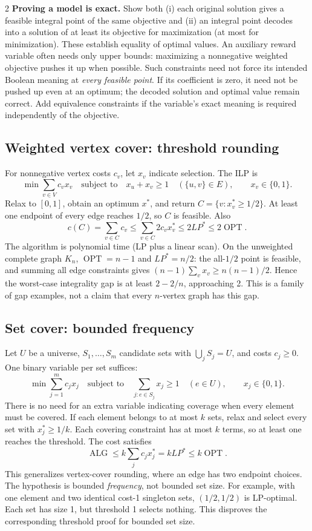 \documentclass[10pt]{article}
\theoremstyle{definition}
\newcommand{\OPT}{\operatorname{OPT}}
\newcommand{\ALG}{\operatorname{ALG}}
\begin{document}
\begin{multicols*}{2}
\textbf{Proving a model is exact.}
Show both (i) each original solution gives a feasible integral point of the
same objective and (ii) an integral point decodes into a solution of at least
its objective for maximization (at most for minimization). These establish
equality of optimal values. An auxiliary reward variable often needs only
upper bounds: maximizing a nonnegative weighted objective pushes it up when
possible. Such constraints need not force its intended Boolean meaning at
\emph{every feasible point}. If its coefficient is zero, it need not be
pushed up even at an optimum; the decoded solution and optimal value remain
correct. Add equivalence constraints if the variable's exact meaning is
required independently of the objective.

\subsection{Weighted vertex cover: threshold rounding}\label{lp:vc}
For nonnegative vertex costs $c_v$, let $x_v$ indicate selection. The ILP is
\[
  \min\sum_{v\in V}c_vx_v
  \quad\text{subject to}\quad
  x_u+x_v\ge1\quad(\{u,v\}\in E),\qquad x_v\in\{0,1\}.
\]
Relax to $[0,1]$, obtain an optimum $x^*$, and return
$C=\{v:x_v^*\ge1/2\}$. At least one endpoint of every edge reaches $1/2$,
so $C$ is feasible. Also
\[
  c(C)=\sum_{v\in C}c_v
    \le\sum_{v\in C}2c_vx_v^*
    \le2LP^*\le2\OPT.
\]
The algorithm is polynomial time (LP plus a linear scan).
On the unweighted complete graph $K_n$, $\OPT=n-1$ and $LP^*=n/2$:
the all-$1/2$ point is feasible, and summing all edge constraints gives
$(n-1)\sum_vx_v\ge n(n-1)/2$. Hence the worst-case integrality gap is
at least $2-2/n$, approaching 2. This is a family of gap examples, not a
claim that every $n$-vertex graph has this gap.

\subsection{Set cover: bounded frequency}\label{lp:cover}
Let $U$ be a universe, $S_1,\ldots,S_m$ candidate sets with
$\bigcup_jS_j=U$, and costs $c_j\ge0$. One binary variable per set suffices:
\[
  \min\sum_{j=1}^m c_jx_j
  \quad\text{subject to}\quad
  \sum_{j:e\in S_j}x_j\ge1\quad(e\in U),\qquad x_j\in\{0,1\}.
\]
There is no need for an extra variable indicating coverage when every
element must be covered. If each element belongs to at most $k$ sets,
relax and select every set with $x_j^*\ge1/k$. Each covering constraint has
at most $k$ terms, so at least one reaches the threshold. The cost satisfies
\[
  \ALG\le k\sum_jc_jx_j^*=kLP^*\le k\OPT.
\]
This generalizes vertex-cover rounding, where an edge has two endpoint
choices. The hypothesis is bounded \emph{frequency}, not bounded set size.
For example, with one element and two identical cost-1 singleton sets,
$(1/2,1/2)$ is LP-optimal. Each set has size 1, but threshold 1 selects
nothing. This disproves the corresponding threshold proof for bounded set
size.


\end{multicols*}
\end{document}
